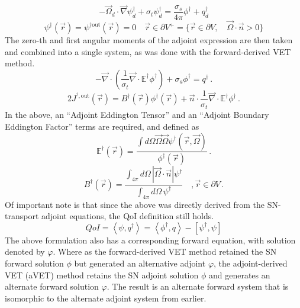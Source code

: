 \documentclass[12pt]{report}
\newcommand{\vr}{\vec{r}}
\newcommand{\vO}{\vec{\Omega}}
\newcommand{\bra}{\left\langle}
\newcommand{\ket}{\right\rangle}
\newcommand{\sbra}{\left[}
\newcommand{\sket}{\right]}
\renewcommand{\div}{\vec{\nabla} \cdot}
\newcommand{\grad}{\vec{\nabla}}
\newcommand{\bound}{\partial V}
\newcommand{\vn}{\vec{n}}
\newcommand{\Edd}{\mathbb{E}}
\newcommand{\BEdd}{B}
\newcommand{\sigt}{\sigma_t}
\newcommand{\sigs}{\sigma_s}
\newcommand{\siga}{\sigma_a}
\newcommand{\angSource}{q}
\newcommand{\scalSource}{q}
\newcommand{\angResp}{q^\dag}
\begin{document}
\begin{equation}
\label{snAdjAlt}
- \vO_d \cdot \grad \psi^\dag_d + \sigt \psi^\dag_d = \frac{\sigs}{4 \pi} \phi^\dag + \angResp_d
\end{equation}
%
\begin{equation}
\psi^\dag(\vr) = \psi^{\dag \text{out}}(\vr)=0 \quad \vr \in \partial V^{+} = \{  \vr \in \bound , \quad \vO \cdot \vec{n} > 0 \}
\end{equation}
The zero-th and first angular moments of the adjoint expression are then taken and combined into a single system, as was done with the forward-derived VET method.
\begin{equation}
\label{TranAdjVEFForm}
- \div \left( \frac{1}{\sigt}\div \Edd^\dag \phi^\dag  \right) + \siga \phi^\dag  = \scalSource^\dag  \,.
\end{equation}
\begin{equation}
2 J^{^\dag,\text{out}}(\vr) = \BEdd^\dag(\vr) \phi^\dag(\vr)  + \vn \cdot \frac{1}{\sigt} \div \Edd^\dag  \phi^\dag  \,.
\end{equation}
In the above, an ``Adjoint Eddington Tensor'' and an ``Adjoint Boundary Eddington Factor'' terms are required, and defined as
\begin{equation}
\label{AdjEddDef}
\Edd^\dag(\vr)=\frac{\int d\Omega \vO \vO \psi^\dag(\vr,\vO)}{\phi^\dag(\vr)} \, .
\end{equation} 
\begin{equation}
\BEdd^\dag(\vr) = \frac{\int_{4 \pi} d\Omega \, | \vO \cdot \vn | \psi^\dag}{\int_{4\pi} d\Omega \, \psi^\dag} \quad , \vr \in \bound \,.
\end{equation}
Of important note is that since the above was directly derived from the SN-transport adjoint equations, the QoI definition  still holds.
\begin{equation}
\label{AdjQoIAlt}
QoI = \bra \psi , \angSource^\dag \ket = \bra \phi^\dag , \angSource \ket - \sbra \psi^\dag,  \psi \sket 
\end{equation}
The above formulation also has a corresponding forward equation, with solution denoted by $\varphi$. Where as the forward-derived VET method retained the SN forward solution $\phi$ but generated an alternative adjoint $\varphi$, the adjoint-derived VET (aVET) method retains the SN adjoint solution $\phi$ and generates an alternate forward solution $\varphi$. The result is an alternate forward system that is isomorphic to the alternate adjoint system from earlier.
\end{document}

